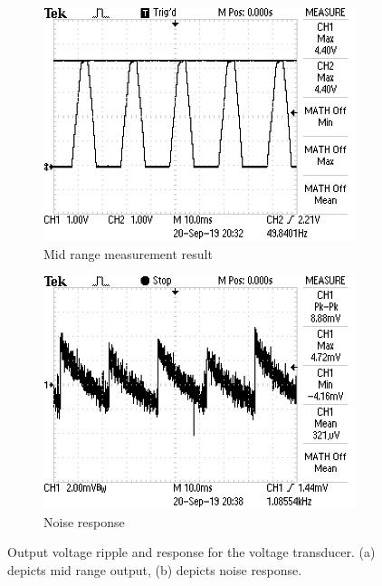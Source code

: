 \begin{figure}[h!]
 \centering
     \begin{subfigure}[]{0.45\textwidth}
        \centering
         \includegraphics[width=1\linewidth]{./Figures/voltagetransducermidrange.JPG}
		    \caption{Mid range measurement result} \label{subfig:voltagetransducermidrangereal}
     \end{subfigure}
      \begin{subfigure}[]{0.45\textwidth}
              \centering
  		\includegraphics[width=1\linewidth]{./Figures/voltagetransducernoise.JPG}
		    \caption{Noise response} \label{subfig:16VACinputchangereal}
     \end{subfigure}
   \caption[Measured results for the voltage transducer]{Output voltage ripple and response for the voltage transducer. (a) depicts mid range output, (b) depicts noise response. }
    \label{fig:simulation_results_box}
 \end{figure}
